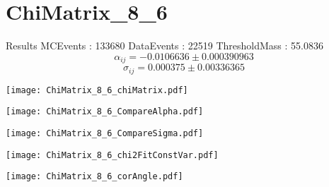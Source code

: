 \documentclass[a4paper,12pt]{article}
\begin{document}
\section{ChiMatrix\_8\_6}
\begin{minipage}{0.49\linewidth} Results \newline
MCEvents : 133680\newline
DataEvents : 22519 \newline
ThresholdMass : 55.0836\\
$$\alpha_{ij} = -0.0106636\pm 0.000390963$$
$$\sigma_{ij} = 0.000375\pm 0.00336365$$
\end{minipage}\hfill
\begin{minipage}{0.49\linewidth} 
\texttt{[image: ChiMatrix\_8\_6\_chiMatrix.pdf]}\\
\end{minipage}
\hfill
\begin{minipage}{0.49\linewidth} 
\texttt{[image: ChiMatrix\_8\_6\_CompareAlpha.pdf]}\\
\end{minipage}
\hfill
\begin{minipage}{0.49\linewidth} 
\texttt{[image: ChiMatrix\_8\_6\_CompareSigma.pdf]}\\
\end{minipage}
\begin{minipage}{0.49\linewidth} 
\texttt{[image: ChiMatrix\_8\_6\_chi2FitConstVar.pdf]}\\
\end{minipage}
\hfill
\begin{minipage}{0.49\linewidth} 
\texttt{[image: ChiMatrix\_8\_6\_corAngle.pdf]}\\
\end{minipage}
\end{document}
